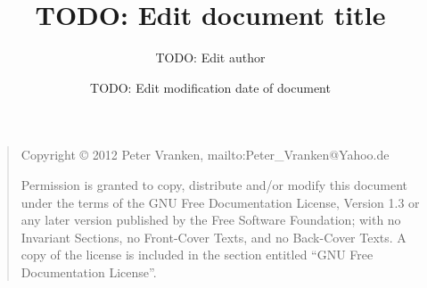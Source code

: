 \documentclass[10pt,twoside,a4paper,openany]{report}
\title{TODO: Edit document title}
\author{TODO: Edit author}
\date{TODO: Edit modification date of document}
\begin{document}
\maketitle

\bigskip
\begin{quote}
    Copyright \copyright{} 2012  Peter Vranken, mailto:Peter\_Vranken@Yahoo.de
    
    Permission is granted to copy, distribute and/or modify this document
    under the terms of the GNU Free Documentation License, Version 1.3
    or any later version published by the Free Software Foundation;
    with no Invariant Sections, no Front-Cover Texts, and no Back-Cover Texts.
    A copy of the license is included in the section entitled ``GNU
    Free Documentation License''.
\end{quote}
\bigskip


\tableofcontents {}
\listoffigures {}
\listoftables {}






\end{document}
